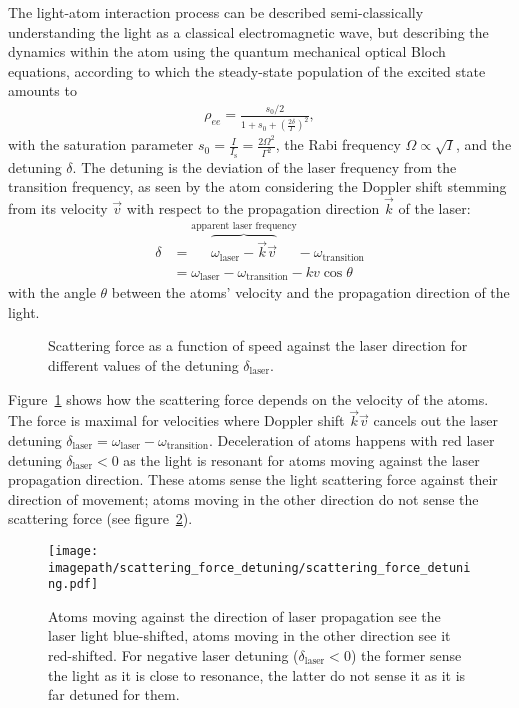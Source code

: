 The light-atom interaction process can be described semi-classically understanding the light as a classical electromagnetic wave, but describing the dynamics within the atom using the quantum mechanical optical Bloch equations, according to which the steady-state population of the excited state amounts to
\begin{align}
    \rho_{ee} = \frac{s_0/2}{1 + s_0 + {\left(\frac{2\delta}{\Gamma}\right)}^2},
\end{align}
with the saturation parameter $s_0 = \frac{I}{I_\text{s}} = \frac{2\Omega^2}{\Gamma^2}$, the Rabi frequency $\Omega \propto \sqrt{I}$, and the detuning $\delta$. The detuning is the deviation of the laser frequency from the transition frequency, as seen by the atom considering the Doppler shift stemming from its velocity $\vec v$ with respect to the propagation direction $\vec k$ of the laser:
\begin{align}
    \delta &= \overbrace{\omega_\text{laser} - \vec k \vec v }^\text{apparent laser frequency}- \omega_\text{transition} \\
    \nonumber & = \omega_\text{laser}  - \omega_\text{transition} - kv \cos \theta
\end{align}
with the angle $\theta$ between the atoms' velocity and the propagation direction of the light.

\begin{figure}
    \centering
    \caption{Scattering force as a function of speed against the laser direction for different values of the detuning $\delta_\text{laser}$.
    }\label{fig:scattering_force_vs_velocity}
\end{figure}

Figure~\ref{fig:scattering_force_vs_velocity} shows how the scattering force depends on the velocity of the atoms. The force is maximal for velocities where Doppler shift $\vec k \vec v$ cancels out the laser detuning $\delta_\text{laser} = \omega_\text{laser} - \omega_\text{transition}$. Deceleration of atoms happens with red laser detuning $\delta_\text{laser} < 0$ as the light is resonant for atoms moving against the laser propagation direction. These atoms sense the light scattering force against their direction of movement; atoms moving in the other direction do not sense the scattering force (see figure~\ref{fig:scattering_force_detuning}).

\begin{figure}
    \centering
    \texttt{[image: \\imagepath/scattering\_force\_detuning/scattering\_force\_detuning.pdf]}
    \caption{Atoms moving against the direction of laser propagation see the laser light blue-shifted, atoms moving in the other direction see it red-shifted. For negative laser detuning ($\delta_\text{laser} < 0$) the former sense the light as it is close to resonance, the latter do not sense it as it is far detuned for them.}\label{fig:scattering_force_detuning}
\end{figure}

